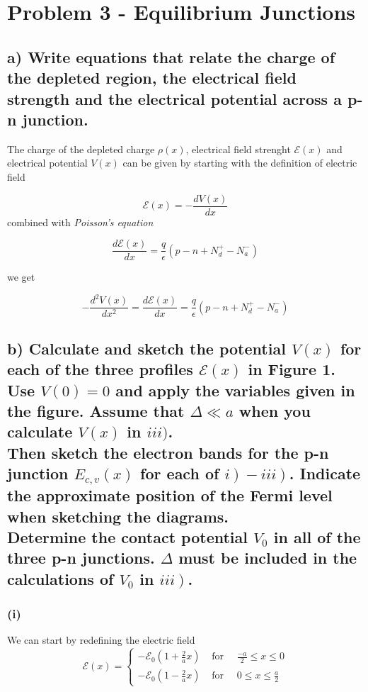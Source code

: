 \section{Problem 3 - Equilibrium Junctions}

\subsection*{a) Write equations that relate the charge of the depleted region, the electrical field strength and the electrical potential across a p-n junction.}

The charge of the depleted charge $\rho(x)$, electrical field strenght $\mathscr{E}(x)$ and electrical potential $V(x)$ can be given by starting with the definition of electric field

\[\mathscr{E}(x)=-\frac{dV(x)}{dx}\]
combined with \textit{Poisson's equation}

\[\frac{d\mathscr{E}(x)}{dx}=\frac{q}{\epsilon}\left(p-n+N_d^+-N_a^-\right)\]

we get 

\[-\frac{d^2V(x)}{dx^2}=\frac{d\mathscr{E}(x)}{dx}=\frac{q}{\epsilon}\left(p-n+N_d^+-N_a^-\right)\]


\subsection*{b) Calculate and sketch the potential \( V(x) \) for each of the three profiles \( \mathscr{E}(x) \) in Figure 1. Use \( V(0)=0 \) and apply the variables given in the figure. Assume that \( \Delta \ll a \) when you calculate \( V(x) \) in \( i i i) \). \\Then sketch the electron bands for the p-n junction \( E_{c, v}(x) \) for each of \( \left.\left.i\right)-i i i\right) \). Indicate the approximate position of the Fermi level when sketching the diagrams.\\Determine the contact potential \( V_{0} \) in all of the three p-n junctions. \( \Delta \) must be included in the calculations of \( V_{0} \) in \( \left.i i i\right) \).}


\subsubsection*{(i)}
We can start by redefining the electric field
\[ \mathscr{E}(x)=\left\{\begin{array}{ll}-\mathscr{E}_{0}\left(1+\frac{2}{a} x\right) & \text { for } \quad \frac{-a}{2} \leq x \leq 0 \\ -\mathscr{E}_{0}\left(1-\frac{2}{a} x\right) & \text { for } \quad 0 \leq x \leq \frac{a}{2}\end{array}\right. \]

